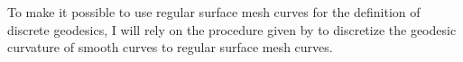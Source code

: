 \documentclass{stdlocal}
\begin{document}

  To make it possible to use regular surface mesh curves for the definition of discrete geodesics, I will rely on the procedure given by \textcite{polthier2006} to discretize the geodesic curvature of smooth curves to regular surface mesh curves.

\end{document}
